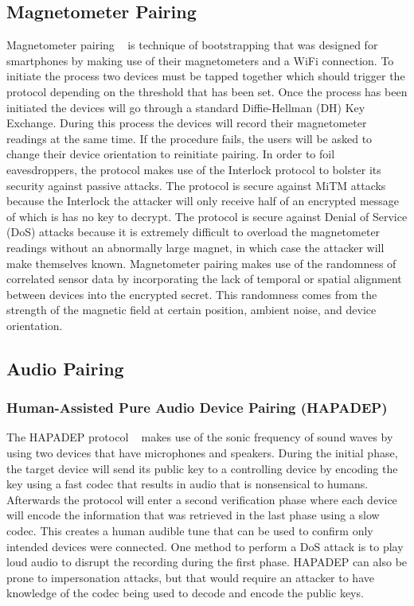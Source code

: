 \subsection{Magnetometer Pairing}
Magnetometer pairing ~\cite{jin2014magpairing} is technique of bootstrapping that was designed for smartphones by making use of their magnetometers and a WiFi connection. To initiate the process two devices must be tapped together which should trigger the protocol depending on the threshold that has been set. Once the process has been initiated the devices will go through a standard Diffie-Hellman (DH) Key Exchange. During this process the devices will record their magnetometer readings at the same time. If the procedure fails, the users will be asked to change their device orientation to reinitiate pairing.  In order to foil eavesdroppers, the protocol makes use of the Interlock protocol to bolster its security against passive attacks. The protocol is secure against MiTM attacks because the Interlock the attacker will only receive half of an encrypted message of which is has no key to decrypt. The protocol is secure against Denial of Service (DoS) attacks because it is extremely difficult to overload the magnetometer readings without an abnormally large magnet, in which case the attacker will make themselves known. Magnetometer pairing makes use of the randomness of correlated sensor data by incorporating the lack of temporal or spatial alignment between devices into the encrypted secret. This randomness comes from the strength of the magnetic field at certain position, ambient noise, and device orientation.

\subsection{Audio Pairing}
\subsubsection{Human-Assisted Pure Audio Device Pairing (HAPADEP)}
The HAPADEP protocol ~\cite{soriente2008hapadep} makes use of the sonic frequency of sound waves by using two devices that have microphones and speakers. During the initial phase, the target device will send its public key to a controlling device by encoding the key using a fast codec that results in audio that is nonsensical to humans. Afterwards the protocol will enter a second verification phase where each device will encode the information that was retrieved in the last phase using a slow codec. This creates a human audible tune that can be used to confirm only intended devices were connected. One method to perform a DoS attack is to play loud audio to disrupt the recording during the first phase. HAPADEP can also be prone to impersonation attacks, but that would require an attacker to have knowledge of the codec being used to decode and encode the public keys. 

